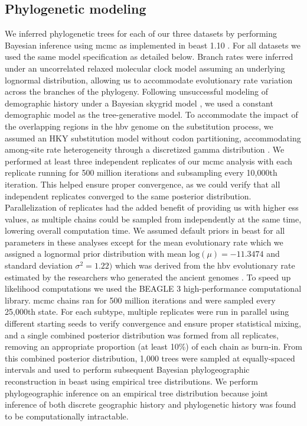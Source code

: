 \subsection{Phylogenetic modeling}

We inferred phylogenetic trees for each of our three datasets by performing Bayesian inference using \gls{mcmc} as implemented in \gls{beast} 1.10 \cite{suchard2018bayesian}.
For all datasets we used the same model specification as detailed below.
Branch rates were inferred under an uncorrelated relaxed molecular clock model assuming an underlying lognormal distribution, allowing us to accommodate evolutionary rate variation across the branches of the phylogeny.
Following unsuccessful modeling of demographic history under a Bayesian skygrid model \cite{gill2013improving}, we used a constant demographic model as the tree-generative model. %
To accommodate the impact of the overlapping regions in the \gls{hbv} genome on the substitution process, we assumed an HKY substitution model \cite{hasegawa1985dating} without codon partitioning, accommodating among-site rate heterogeneity through a discretized gamma distribution \cite{yang1993maximum}.
We performed at least three independent replicates of our \gls{mcmc} analysis with each replicate running for 500 million iterations and subsampling every 10,000th iteration.
This helped ensure proper convergence, as we could verify that all independent replicates converged to the same posterior distribution.
Parallelization of replicates had the added benefit of providing us with higher \gls{ess} values, as multiple chains could be sampled from independently at the same time, lowering overall computation time.
We assumed default priors in \gls{beast} for all parameters in these analyses except for the mean evolutionary rate which we assigned a lognormal prior distribution with mean $\text{log}(\mu)=-11.3474$ and standard deviation $\sigma^{2}=1.22)$ which was derived from the \gls{hbv} evolutionary rate estimated by the researchers who generated the ancient genomes \cite{muhlemann2018ancient}. %
To speed up likelihood computations we used the BEAGLE 3 high-performance computational library.
\gls{mcmc} chains ran for 500 million iterations and were sampled every 25,000th state.
For each subtype, multiple replicates were run in parallel using different starting seeds to verify convergence and ensure proper statistical mixing, and a single combined posterior distribution was formed from all replicates, removing an appropriate proportion (at least 10\%) of each chain as burn-in.
From this combined posterior distribution, 1,000 trees were sampled at equally-spaced intervals and used to perform subsequent Bayesian phylogeographic reconstruction in \gls{beast} using empirical tree distributions.
We perform phylogeographic inference on an empirical tree distribution because joint inference of both discrete geographic history and phylogenetic history was found to be computationally intractable.

